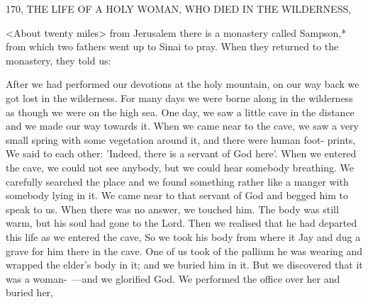 170, THE LIFE OF A HOLY WOMAN,
WHO DIED IN THE WILDERNESS,

<About twenty miles> from Jerusalem there is a monastery called
Sampson,* from which two fathers went up to Sinai to pray.
When
they returned to the monastery, they told us:

After we had performed our devotions at the holy mountain, on our
way back we got lost in the wilderness.
For many days we were
borne along in the wilderness as though we were on the high sea.
One day, we saw a little cave in the distance and we made our way
towards it.
When we came near to the cave, we saw a very small
spring with some vegetation around it, and there were human foot-
prints, We said to each other: 'Indeed, there is a servant of God
here'.
When we entered the cave, we could not see anybody, but we
could hear somebody breathing.
We carefully searched the place and
we found something rather like a manger with somebody lying in it.
We came near to that servant of God and begged him to speak to
us.
When there was no answer, we touched him.
The body was still
warm, but his soul had gone to the Lord.
Then we realised that he
had departed this life as we entered the cave, So we took his body
from where it Jay and dug a grave for him there in the cave.
One of
us took of the pallium he was wearing and wrapped the elder's body
in it; and we buried him in it.
But we discovered that it was a
woman-~—and we glorified God.
We performed the office over her
and buried her,

